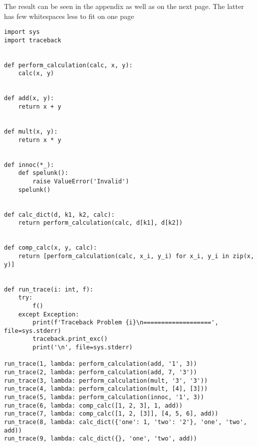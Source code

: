 \documentclass[8pt, a4paper]{article}
\begin{document}
The result can be seen in the appendix as well as on the next page. The latter has few whitespaces less to fit on one page




\clearpage

\begin{verbatim}
import sys
import traceback


def perform_calculation(calc, x, y):
    calc(x, y)


def add(x, y):
    return x + y


def mult(x, y):
    return x * y


def innoc(*_):
    def spelunk():
        raise ValueError('Invalid')
    spelunk()


def calc_dict(d, k1, k2, calc):
    return perform_calculation(calc, d[k1], d[k2])


def comp_calc(x, y, calc):
    return [perform_calculation(calc, x_i, y_i) for x_i, y_i in zip(x, y)]


def run_trace(i: int, f):
    try:
        f()
    except Exception:
        print(f'Traceback Problem {i}\n===================', file=sys.stderr)
        traceback.print_exc()
        print('\n', file=sys.stderr)

run_trace(1, lambda: perform_calculation(add, '1', 3))
run_trace(2, lambda: perform_calculation(add, 7, '3'))
run_trace(3, lambda: perform_calculation(mult, '3', '3'))
run_trace(4, lambda: perform_calculation(mult, [4], [3]))
run_trace(5, lambda: perform_calculation(innoc, '1', 3))
run_trace(6, lambda: comp_calc([1, 2, 3], 1, add))
run_trace(7, lambda: comp_calc([1, 2, [3]], [4, 5, 6], add))
run_trace(8, lambda: calc_dict({'one': 1, 'two': '2'}, 'one', 'two', add))
run_trace(9, lambda: calc_dict({}, 'one', 'two', add))

\end{verbatim}
\end{document}
